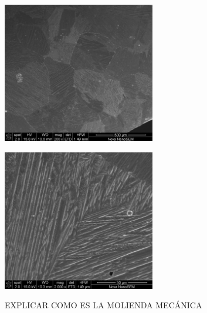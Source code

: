 \documentclass[usenames,dvipsnames]{beamer}
\begin{document}
% 
% 







\begin{frame}

\begin{multicols}{2}

\includegraphics[width=0.5\textwidth]{img/tamgrano/L1B1_016.jpg}

\includegraphics[width=0.5\textwidth]{img/tamgrano/L1B1_014.jpg}
 
\end{multicols}
\end{frame}


\begin{frame}
 EXPLICAR COMO ES LA MOLIENDA MECÁNICA
\end{frame}
\end{document}
